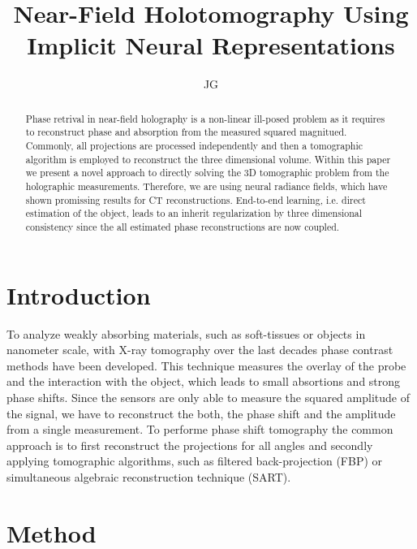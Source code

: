 \documentclass[a4paper, 10pt]{article}
\title{Near-Field Holotomography Using Implicit Neural Representations}
\author{JG}
\begin{document}
\maketitle

\begin{abstract}
Phase retrival in near-field holography is a non-linear ill-posed problem as it requires to reconstruct phase and absorption from the measured squared magnitued. 
Commonly, all projections are processed independently and then a tomographic algorithm is employed to reconstruct the three dimensional volume. 
Within this paper we present a novel approach to directly solving the 3D tomographic problem from the holographic measurements.
Therefore, we are using neural radiance fields, which have shown promissing results for CT reconstructions. 
End-to-end learning, i.e. direct estimation of the object, leads to an inherit regularization by three dimensional consistency since the all estimated phase reconstructions are now coupled. 

\end{abstract}

\section{Introduction}
To analyze weakly absorbing materials, such as soft-tissues or objects in nanometer scale, with X-ray tomography over the last decades phase contrast methods have been developed. 
This technique measures the overlay of the probe and the interaction with the object, which leads to small absortions and strong phase shifts. 
Since the sensors are only able to measure the squared amplitude of the signal, we have to reconstruct the both, the phase shift and the amplitude from a single measurement. 
To performe phase shift tomography the common approach is to first reconstruct the projections for all angles and secondly applying tomographic algorithms, such as filtered back-projection (FBP) or simultaneous algebraic reconstruction technique (SART). 

\section{Method}%
\label{sec:Method}
\end{document}
